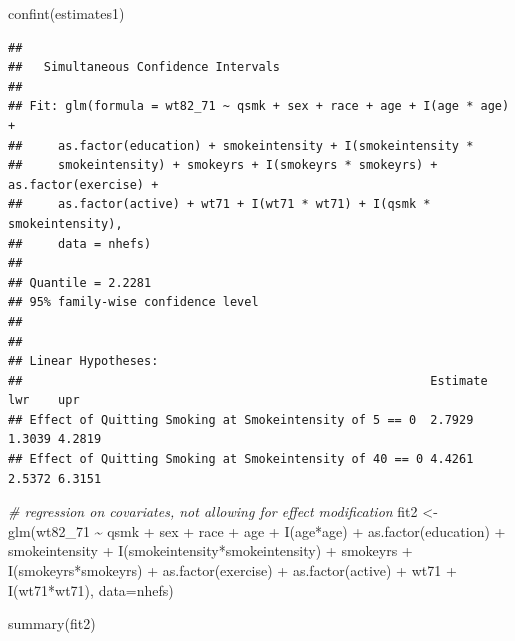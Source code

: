 \documentclass[
  10pt,
]{book}
\newenvironment{Shaded}{\begin{snugshade}}{\end{snugshade}}
\newcommand{\AttributeTok}[1]{\textcolor[rgb]{0.77,0.63,0.00}{#1}}
\newcommand{\CommentTok}[1]{\textcolor[rgb]{0.56,0.35,0.01}{\textit{#1}}}
\newcommand{\FunctionTok}[1]{\textcolor[rgb]{0.00,0.00,0.00}{#1}}
\newcommand{\NormalTok}[1]{#1}
\newcommand{\OtherTok}[1]{\textcolor[rgb]{0.56,0.35,0.01}{#1}}
\newcommand{\SpecialCharTok}[1]{\textcolor[rgb]{0.00,0.00,0.00}{#1}}
\begin{document}
\begin{Shaded}
\begin{Highlighting}[]
  \FunctionTok{confint}\NormalTok{(estimates1)}
\end{Highlighting}
\end{Shaded}

\begin{verbatim}
## 
##   Simultaneous Confidence Intervals
## 
## Fit: glm(formula = wt82_71 ~ qsmk + sex + race + age + I(age * age) + 
##     as.factor(education) + smokeintensity + I(smokeintensity * 
##     smokeintensity) + smokeyrs + I(smokeyrs * smokeyrs) + as.factor(exercise) + 
##     as.factor(active) + wt71 + I(wt71 * wt71) + I(qsmk * smokeintensity), 
##     data = nhefs)
## 
## Quantile = 2.2281
## 95% family-wise confidence level
##  
## 
## Linear Hypotheses:
##                                                         Estimate lwr    upr   
## Effect of Quitting Smoking at Smokeintensity of 5 == 0  2.7929   1.3039 4.2819
## Effect of Quitting Smoking at Smokeintensity of 40 == 0 4.4261   2.5372 6.3151
\end{verbatim}

\begin{Shaded}
\begin{Highlighting}[]
\CommentTok{\# regression on covariates, not allowing for effect modification}
\NormalTok{fit2 }\OtherTok{\textless{}{-}} \FunctionTok{glm}\NormalTok{(wt82\_71 }\SpecialCharTok{\textasciitilde{}}\NormalTok{ qsmk }\SpecialCharTok{+}\NormalTok{ sex }\SpecialCharTok{+}\NormalTok{ race }\SpecialCharTok{+}\NormalTok{ age }\SpecialCharTok{+} \FunctionTok{I}\NormalTok{(age}\SpecialCharTok{*}\NormalTok{age) }\SpecialCharTok{+} \FunctionTok{as.factor}\NormalTok{(education)}
           \SpecialCharTok{+}\NormalTok{ smokeintensity }\SpecialCharTok{+} \FunctionTok{I}\NormalTok{(smokeintensity}\SpecialCharTok{*}\NormalTok{smokeintensity) }\SpecialCharTok{+}\NormalTok{ smokeyrs}
           \SpecialCharTok{+} \FunctionTok{I}\NormalTok{(smokeyrs}\SpecialCharTok{*}\NormalTok{smokeyrs) }\SpecialCharTok{+} \FunctionTok{as.factor}\NormalTok{(exercise) }\SpecialCharTok{+} \FunctionTok{as.factor}\NormalTok{(active)}
           \SpecialCharTok{+}\NormalTok{ wt71 }\SpecialCharTok{+} \FunctionTok{I}\NormalTok{(wt71}\SpecialCharTok{*}\NormalTok{wt71), }\AttributeTok{data=}\NormalTok{nhefs)}
  
\FunctionTok{summary}\NormalTok{(fit2)}
\end{Highlighting}
\end{Shaded}
\end{document}
